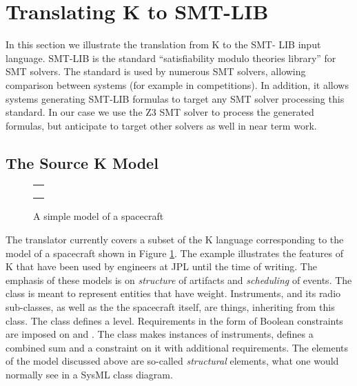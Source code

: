 
\section{Translating K to SMT-LIB}
\label{sec:k2smt}

In this section we illustrate the translation from K to the SMT- LIB
input language. SMT-LIB \cite{smt-lib} is the standard
``satisfiability modulo theories library'' for SMT solvers. The
standard is used by numerous SMT solvers, allowing comparison between
systems (for example in competitions).  In addition, it allows systems
generating SMT-LIB formulas to target any SMT solver processing this
standard. In our case we use the Z3 SMT solver \cite{de2008z3} to
process the generated formulas, but anticipate to target other solvers
as well in near term work.

\subsection{The Source K Model}

\begin{figure}
\centering
\begin{tabular}{c}
\hline \\
 \\ \\
\hline
\end{tabular}
\caption{A simple \Klang{} model of a spacecraft}
\label{fig:spacecraftSmt}
\end{figure}

The translator currently covers a subset of the K language
corresponding to the model of a spacecraft shown in Figure
\ref{fig:spacecraftSmt}. The example illustrates the features of K
that have been used by engineers at JPL until the time of writing. The
emphasis of these models is on {\em structure} of artifacts and {\em
  scheduling} of events. The class  is meant to represent
entities that have weight. Instruments, and its radio sub-classes, as
well as the the spacecraft itself, are things, inheriting from this
class. The class  defines a 
level. Requirements in the form of Boolean constraints are imposed on
 and . The  class makes
instances of instruments, defines a combined sum
 and a constraint on it with additional
requirements. The elements of the model discussed above are so-called
{\em structural} elements, what one would normally see in a SysML
class diagram.


